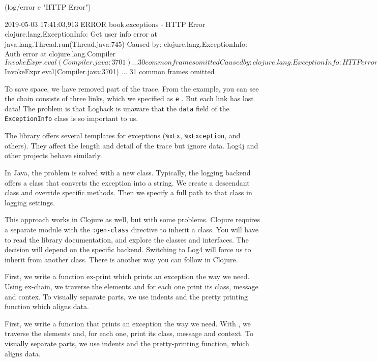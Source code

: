 \else

\begin{clojure}
(log/error e "HTTP Error")

2019-05-03 17:41:03,913 ERROR book.exceptions - HTTP Error
clojure.lang.ExceptionInfo: Get user info error
    at java.lang.Thread.run(Thread.java:745)
Caused by: clojure.lang.ExceptionInfo: Auth error
    at clojure.lang.Compiler$InvokeExpr.eval(Compiler.java:3701)
    ... 30 common frames omitted
Caused by: clojure.lang.ExceptionInfo: HTTP error
    at clojure.lang.Compiler$InvokeExpr.eval(Compiler.java:3701)
    ... 31 common frames omitted
\end{clojure}

\fi

To save space, we have removed part of the trace. From the example, you can see the chain consists of three links, which we specified as \verb|e| . But each link has lost data! The problem is that Logback is unaware that the \verb|data| field of the \verb|ExceptionInfo| class is so important to us.


The library offers several templates for exceptions (\verb|%xEx|, \verb|%xException|, and others). They affect the length and detail of the trace but ignore data. Log4j and other projects behave similarly.

In Java, the problem is solved with a new class. Typically, the logging backend offers a class that converts the exception into a string. We create a descendant class and override specific methods. Then we specify a full path to that class in logging settings.

This approach works in Clojure as well, but with some problems. Clojure requires a separate module with the \verb|:gen-class| directive to inherit a class. You will have to read the library documentation, and explore the classes and interfaces. The decision will depend on the specific backend. Switching to Log4 will force us to inherit from another class. There is another way you can follow in Clojure.

First, we write a function ex-print which prints an exception the way we need. Using ex-chain, we traverse the elements and for each one print its class, message and contex. To visually separate parts, we use indents and the pretty printing function which aligns data.

First, we write a function  that prints an exception the way we need. With , we traverse the elements and, for each one, print its class, message and context. To visually separate parts, we use indents and the pretty-printing function, which aligns data.

